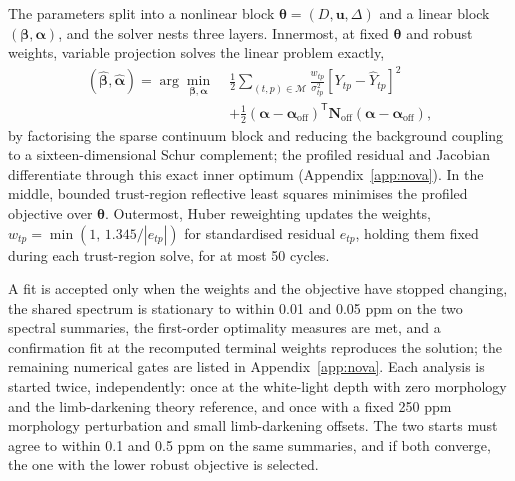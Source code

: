 
The parameters split into a nonlinear block
$\bm{\theta}=(D,\bm{u},\Delta)$ and a linear block
$(\bm{\beta},\bm{\alpha})$, and the solver nests three layers. Innermost,
at fixed $\bm{\theta}$ and robust weights, variable projection
\citep{GolubPereyra1973} solves the linear problem exactly,
\begin{equation}
\begin{split}
 (\widehat{\bm{\beta}},\widehat{\bm{\alpha}})=
 \arg\min_{\bm{\beta},\bm{\alpha}}\;
 &\frac{1}{2}\sum_{(t,p)\in\mathcal{M}}\frac{w_{tp}}{\sigma_{tp}^2}
 \left[Y_{tp}-\widehat Y_{tp}\right]^2 \\
 &+\frac{1}{2}(\bm{\alpha}-\bm{\alpha}_{\mathrm{off}})^{\mathsf T}
   \bm{N}_{\mathrm{off}}(\bm{\alpha}-\bm{\alpha}_{\mathrm{off}}),
\end{split}
 \label{eq:varpro}
\end{equation}
by factorising the sparse continuum block and reducing the background
coupling to a sixteen-dimensional Schur complement; the profiled residual
and Jacobian differentiate through this exact inner optimum
(Appendix~\ref{app:nova}). In the middle, bounded trust-region reflective
least squares \citep{BranchColemanLi1999} minimises the profiled
objective over $\bm{\theta}$. Outermost, Huber reweighting
\citep{Huber1964} updates the weights,
$w_{tp}=\min(1,\,1.345/|e_{tp}|)$ for standardised residual $e_{tp}$,
holding them fixed during each trust-region solve, for at most 50 cycles.

A fit is accepted only when the weights and the objective have stopped
changing, the shared spectrum is stationary to within 0.01 and 0.05 ppm
on the two spectral summaries, the first-order optimality measures are
met, and a confirmation fit at the recomputed terminal weights
reproduces the solution; the remaining numerical gates are listed in
Appendix~\ref{app:nova}. Each analysis is started twice, independently:
once at the white-light depth with zero morphology and the
limb-darkening theory reference, and once with a fixed 250 ppm
morphology perturbation and small limb-darkening offsets. The two starts
must agree to within 0.1 and 0.5 ppm on the same summaries, and if both
converge, the one with the lower robust objective is selected.

